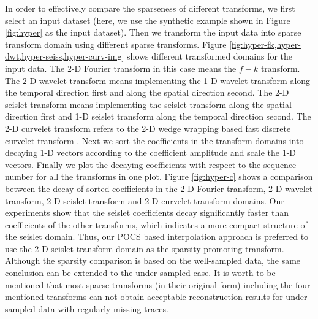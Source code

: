 In order to effectively compare the sparseness of different transforms, we first select an input dataset (here, we use the synthetic example shown in Figure \ref{fig:hyper} as the input dataset). Then we transform the input data into sparse transform domain using different sparse transforms. Figure \ref{fig:hyper-fk,hyper-dwt,hyper-seiss,hyper-curv-img} shows different transformed domains for the input data. The 2-D Fourier transform in this case means the $f-k$ transform. The 2-D wavelet transform means implementing the 1-D wavelet transform along the temporal direction first and along the spatial direction second. The 2-D seislet transform means implementing the seislet transform along the spatial direction first and 1-D seislet transform along the temporal direction second. The 2-D curvelet transform refers to the 2-D wedge wrapping based fast discrete curvelet transform \cite{candes20061}. Next we sort the coefficients in the transform domains into decaying 1-D vectors according to the coefficient amplitude and scale the 1-D vectors. Finally we plot the decaying coefficients with respect to the sequence number for all the transforms in one plot. Figure \ref{fig:hyper-c} shows a comparison between the decay of sorted coefficients in the 2-D Fourier transform, 2-D wavelet transform, 2-D seislet transform and 2-D curvelet transform domains. Our experiments show that the seislet coefficients decay significantly faster than coefficients of the other transforms, which indicates a more compact structure of the seislet domain. Thus, our POCS based interpolation approach is preferred to use the 2-D seislet transform domain as the sparsity-promoting transform. Although the sparsity comparison is based on the well-sampled data, the same conclusion can be extended to the under-sampled case. It is worth to be mentioned that most sparse transforms (in their original form) including the four mentioned transforms can not obtain acceptable reconstruction results for under-sampled data with regularly missing traces.


